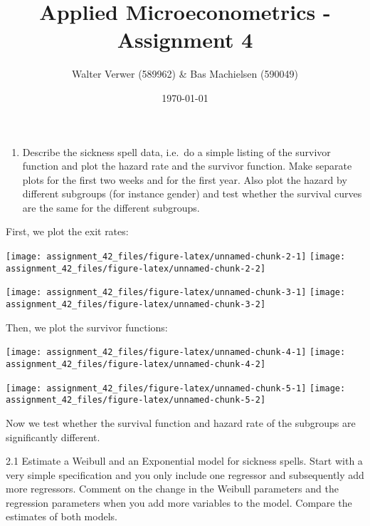 \documentclass[
]{article}
\title{Applied Microeconometrics - Assignment 4}
\author{Walter Verwer (589962) \& Bas Machielsen (590049)}
\date{\today}
\providecommand{\tightlist}{%
  \setlength{\itemsep}{0pt}\setlength{\parskip}{0pt}}
\begin{document}
\maketitle

\begin{enumerate}
\def\labelenumi{\arabic{enumi}.}
\tightlist
\item
  Describe the sickness spell data, i.e.~do a simple listing of the
  survivor function and plot the hazard rate and the survivor function.
  Make separate plots for the first two weeks and for the first year.
  Also plot the hazard by different subgroups (for instance gender) and
  test whether the survival curves are the same for the different
  subgroups.
\end{enumerate}

First, we plot the exit rates:

\texttt{[image: assignment\_42\_files/figure-latex/unnamed-chunk-2-1]}
\texttt{[image: assignment\_42\_files/figure-latex/unnamed-chunk-2-2]}

\texttt{[image: assignment\_42\_files/figure-latex/unnamed-chunk-3-1]}
\texttt{[image: assignment\_42\_files/figure-latex/unnamed-chunk-3-2]}

Then, we plot the survivor functions:

\texttt{[image: assignment\_42\_files/figure-latex/unnamed-chunk-4-1]}
\texttt{[image: assignment\_42\_files/figure-latex/unnamed-chunk-4-2]}

\texttt{[image: assignment\_42\_files/figure-latex/unnamed-chunk-5-1]}
\texttt{[image: assignment\_42\_files/figure-latex/unnamed-chunk-5-2]}

Now we test whether the survival function and hazard rate of the
subgroups are significantly different.

\clearpage

2.1 Estimate a Weibull and an Exponential model for sickness spells.
Start with a very simple specification and you only include one
regressor and subsequently add more regressors. Comment on the change in
the Weibull parameters and the regression parameters when you add more
variables to the model. Compare the estimates of both models.
\end{document}
